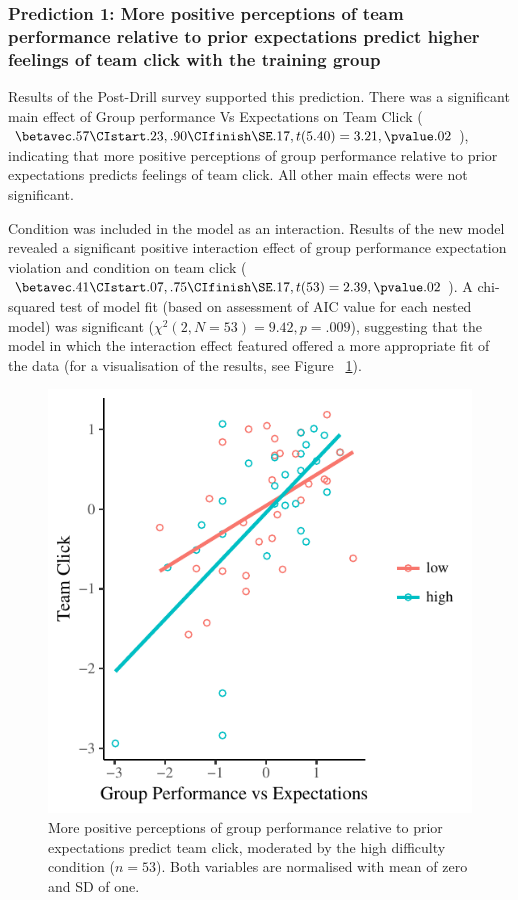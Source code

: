 \subsubsection{Prediction 1: More positive perceptions of team performance relative to prior expectations predict higher feelings of team click with the training group}

Results of the Post-Drill survey supported this prediction. There was a significant main effect of Group performance Vs Expectations on Team Click ($\betavec .57 \CIstart .23, .90 \CIfinish \SE .17, t(5.40) = 3.21, \pvalue .02$), indicating that more positive perceptions of group performance relative to prior expectations predicts feelings of team click.  All other main effects were not significant.

Condition was included in the model as an interaction.  Results of the new model revealed a significant positive interaction effect of group performance expectation violation and condition on team click ($\betavec .41 \CIstart .07, .75 \CIfinish \SE .17, t(53) = 2.39, \pvalue .02 $).  A chi-squared test of model fit (based on assessment of AIC value for each nested model) was significant ($\chi^2 (2, N = 53) = 9.42, p = .009$), suggesting that the model in which the interaction effect featured offered a more appropriate fit of the data (for a visualisation of the results, see Figure ~\ref{fig:teamPerfExpClickScatter}).

\begin{figure}
    \centering
    \includegraphics[width=0.5\linewidth,keepaspectratio] {images/teamPerfExpClickScatter-1}
    \caption{More positive perceptions of group performance relative to prior expectations predict team click, moderated by the high difficulty condition  ($n = 53$).  Both  variables are normalised with mean of zero and SD of one.}
    \label{fig:teamPerfExpClickScatter}
\end{figure}

